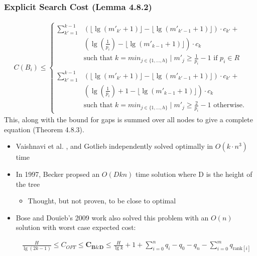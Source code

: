 \documentclass{beamer}
\theoremstyle{plain}
\begin{document}
\begin{frame}\frametitle{Explicit Search Cost (Lemma 4.8.2)}
\begin{align*} 
C(B_i) \leq 
\begin{cases}
 \sum_{k'=1}^{k-1} &\left(\lfloor \lg(m'_{k'}+1) \rfloor - \lfloor \lg(m'_{k'-1}+1) \rfloor \right)\cdot c_{k'}+ \\
 &\left(\lg(\frac{1}{p_i}) - \lfloor \lg(m'_{k-1}+1) \rfloor \right)\cdot c_k\\
&\text{such that } k=min_{j \in \{1, ..., h\}} \mid m'_j \geq \frac{1}{p_i}-1 \text{ if } p_i \in R \\\\
 \sum_{k'=1}^{k-1} &\left(\lfloor \lg(m'_{k'}+1) \rfloor - \lfloor \lg(m'_{k'-1}+1) \rfloor \right)\cdot c_{k'}+ \\
 &\left(\lg(\frac{1}{p_i}) + 1 - \lfloor \lg(m'_{k-1}+1) \rfloor \right)\cdot c_k\\
&\text{such that } k=min_{j \in \{1, ..., h\}} \mid m'_j \geq \frac{2}{p_i}-1 \text{ otherwise.}  
\end{cases}
\end{align*}
This, along with the bound for gaps is summed over all nodes to give a complete equation (Theorem 4.8.3).
\end{frame}

\begin{frame}

\begin{itemize}

\item Vaishnavi et al. \cite{vaishnavi1980optimum}, and Gotlieb  \cite{gotlieb1981optimal} independently solved optimally in $O(k\cdot n^3)$ time

\item In 1997, Becker propsed an $O(Dkn)$ time solution where D is the height of the tree \cite{becker1997construction}
\begin{itemize}
\item Thought, but not proven, to be close to optimal
\end{itemize}

\item Bose and Dou\"{i}eb's 2009 work also solved this problem with an $O(n)$ solution with worst case expected cost:
\begin{scriptsize}
\begin{align*}
\frac{H}{\lg(2k-1)} \leq C_{OPT} \leq \mathbf{C_{B \& D}} \leq \frac{H}{\lg k} + 1 + \sum_{i=0}^n q_i - q_0 - q_n - \sum_{i=0}^m q_{\text{rank}[i]}
\end{align*}
\end{scriptsize}

\end{itemize}


\end{frame}
\end{document}
